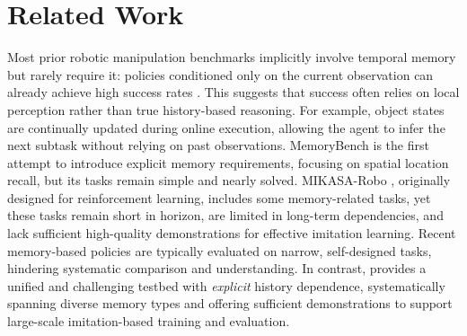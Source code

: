 \section{Related Work}
\label{sec:related_work}

Most prior robotic manipulation benchmarks \cite{liu2023libero, li24simpler, mees2022calvin, zhu2020robosuite} implicitly involve temporal memory but rarely require it: policies conditioned only on the current observation can already achieve high success rates \cite{pi05, wang2025vlaadaptor, dai2025aimbot}. This suggests that success often relies on local perception rather than true history-based reasoning. For example, object states are continually updated during online execution, allowing the agent to infer the next subtask without relying on past observations.
MemoryBench \cite{fang2025sam2act} is the first attempt to introduce explicit memory requirements, focusing on spatial location recall, but its tasks remain simple and nearly solved. MIKASA-Robo \cite{cherepanov2025memory}, originally designed for reinforcement learning, includes some memory-related tasks, yet these tasks remain short in horizon, are limited in long-term dependencies, and lack sufficient high-quality demonstrations for effective imitation learning.
Recent memory-based policies \cite{shi2025memoryvla, sridhar2025memer} are typically evaluated on narrow, self-designed tasks, hindering systematic comparison and understanding.
In contrast, \benchname\xspace provides a unified and challenging testbed with \emph{explicit} history dependence, systematically spanning diverse memory types and offering sufficient demonstrations to support large-scale imitation-based training and evaluation.

